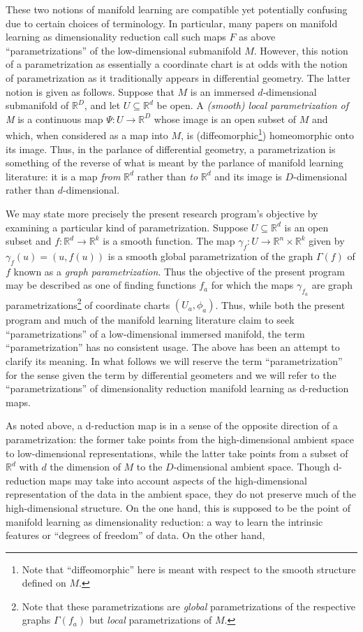 \documentclass[11pt]{article}
\newcommand{\R}{\ensuremath{\mathbb{R}}}
\numberwithin{equation}{section}
\begin{document}
These two notions of manifold learning are compatible yet potentially confusing due to certain choices of terminology. In particular, many papers on manifold learning as dimensionality reduction call such maps $F$ as above ``parametrizations'' of the low-dimensional submanifold $M$. However, this notion of a parametrization as essentially a coordinate chart is at odds with the notion of parametrization as it traditionally appears in differential geometry. The latter notion is given as follows. Suppose that $M$ is an immersed $d$-dimensional submanifold of $\R^D$, and let $U \subseteq \R^d$ be open. A \emph{(smooth) local parametrization of M} is a continuous map $\Psi: U \to \R^D$ whose image is an open subset of $M$ and which, when considered as a map into $M$, is (diffeomorphic\footnote{Note that ``diffeomorphic'' here is meant with respect to the smooth structure defined on $M$.}) homeomorphic onto its image. Thus, in the parlance of differential geometry, a parametrization is something of the reverse of what is meant by the parlance of manifold learning literature: it is a map \emph{from} $\R^d$ rather than \emph{to} $\R^d$ and its image is $D$-dimensional rather than $d$-dimensional.

We may state more precisely the present research program's objective by examining a particular kind of parametrization. Suppose $U \subseteq \R^d$ is an open subset and $f: \R^d \to \R^k$ is a smooth function. The map $\gamma_f: U \to \R^n \times \R^k$ given by $\gamma_f(u) = (u, f(u))$ is a smooth global parametrization of the graph $\Gamma(f)$ of $f$ known as a \emph{graph parametrization}. Thus the objective of the present program may be described as one of finding functions $f_a$ for which the maps $\gamma_{f_a}$ are graph parametrizations\footnote{Note that these parametrizations are \emph{global} parametrizations of the respective graphs $\Gamma(f_a)$ but \emph{local} parametrizations of $M$.} of coordinate charts $(U_a, \phi_a)$. Thus, while both the present program and much of the manifold learning literature claim to seek ``parametrizations'' of a low-dimensional immersed manifold, the term ``parametrization'' has no consistent usage. The above has been an attempt to clarify its meaning. In what follows we will reserve the term ``parametrization'' for the sense given the term by differential geometers and we will refer to the ``parametrizations'' of dimensionality reduction manifold learning as d-reduction maps. 

As noted above, a d-reduction map is in a sense of the opposite direction of a parametrization: the former take points from the high-dimensional ambient space to low-dimensional representations, while the latter take points from a subset of $\R^d$ with $d$ the dimension of $M$ to the $D$-dimensional ambient space. Though d-reduction maps may take into account aspects of the high-dimensional representation of the data in the ambient space, they do not preserve much of the high-dimensional structure. On the one hand, this is supposed to be the point of manifold learning as dimensionality reduction: a way to learn the intrinsic features or ``degrees of freedom'' of data. On the other hand, 
\end{document}
